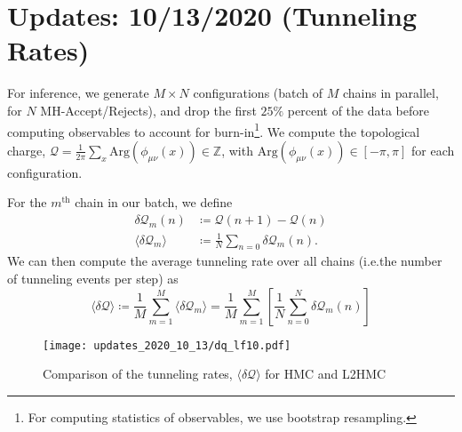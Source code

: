 %
\section{Updates: 10/13/2020 (Tunneling Rates)}%
\label{sec:updates_2020_10_13}
%
For inference, we generate \(M\times N\) configurations (batch of \(M\) chains in
parallel, for \(N\) MH-Accept/Rejects), and drop the first \(25\%\)
percent of the data before computing observables to account for
burn-in\footnote{For computing statistics of observables, we use bootstrap
resampling.}.
%
We compute the topological charge, \(\mathcal{Q} =
\frac{1}{2\pi}\sum_{x}\mathrm{Arg}\left(\phi_{\mu\nu}(x)\right) \in
\mathbb{Z}\), with \( \mathrm{Arg}\left(\phi_{\mu\nu}(x)\right) \in \left[-\pi,
\pi\right]\) for each configuration.
%

For the \(m^{\mathrm{th}}\) chain in our batch, we define 
%
\begin{align}
  \delta\mathcal{Q}_{m}(n) &\coloneqq \mathcal{Q}{(n+1)} - \mathcal{Q}{(n)}\\
  \langle\delta\mathcal{Q}_{m}\rangle &\coloneqq
  \frac{1}{N}\sum_{n=0}\delta\mathcal{Q}_{m}(n).
\end{align}
%
We can then compute the average tunneling rate over all chains (i.e.\@ the
number of tunneling events per step) as
%
\begin{equation}
  \langle \delta\mathcal{Q}\rangle%
  \coloneqq \frac{1}{M}\sum_{m=1}^{M}\langle\delta\mathcal{Q}_{m}\rangle
  =\frac{1}{M}\sum_{m=1}^{M}\left[\frac{1}{N}\sum_{n=0}^{N} \delta\mathcal{Q}_{m}(n)\right]
\end{equation}
%

\begin{figure}[htpb]
  \centering
  \texttt{[image: updates\_2020\_10\_13/dq\_lf10.pdf]}
  \caption{Comparison of the tunneling rates,
  \(\langle\delta\mathcal{Q}\rangle\) for HMC and L2HMC}
\end{figure}

